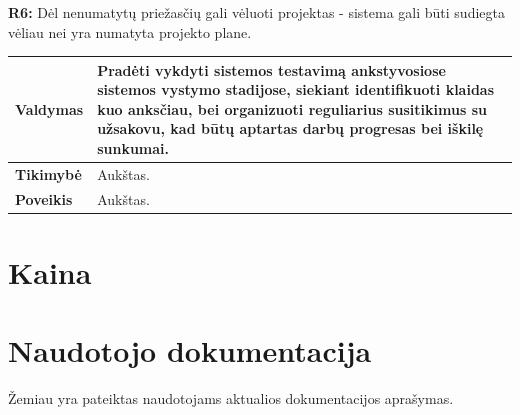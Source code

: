 \documentclass[12pt]{article}
\begin{document}
\noindent \textbf{R6:} Dėl nenumatytų priežasčių gali vėluoti projektas -
sistema gali būti sudiegta vėliau nei yra numatyta projekto plane.
\label{sec:R6}
\begin{table}[htb!]
    \captionsetup{justification=centering}
    \vskip -10pt
    \begin{tabular}{|m{3cm}|m{13.7cm}|}
        \hline
        \raggedleft \textbf{\cellcolor{deepchampagne}Valdymas} &
        Pradėti vykdyti sistemos testavimą ankstyvosiose sistemos vystymo
        stadijose, siekiant identifikuoti klaidas kuo anksčiau, bei organizuoti
        reguliarius susitikimus su užsakovu, kad būtų aptartas darbų progresas
        bei iškilę sunkumai. \\
        \hline
        \raggedleft \textbf{\cellcolor{deepchampagne}Tikimybė} & Aukštas. \\
        \hline
        \raggedleft \textbf{\cellcolor{deepchampagne}Poveikis} & Aukštas. \\
        \hline
    \end{tabular}
\end{table}

\newpage

\section{Kaina}

\section{Naudotojo dokumentacija}
Žemiau yra pateiktas naudotojams aktualios dokumentacijos aprašymas.
\end{document}
